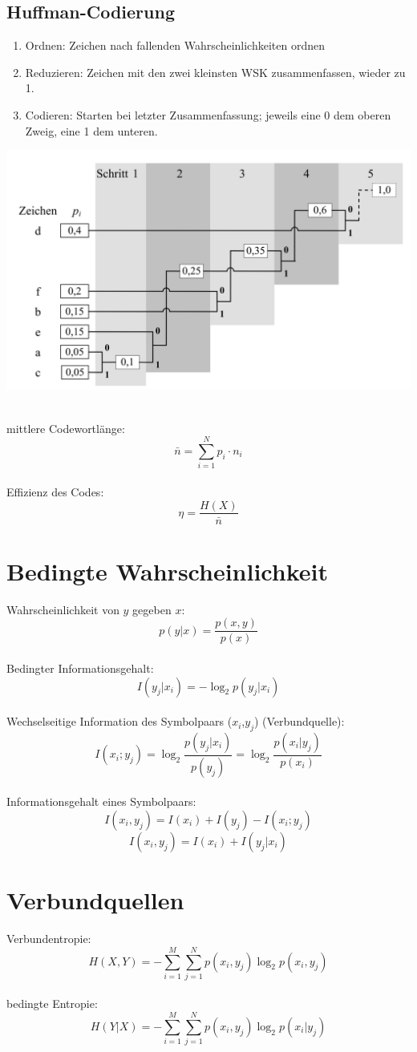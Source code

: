 \subsection{Huffman-Codierung}
\begin{enumerate}
	\item Ordnen: Zeichen nach fallenden Wahrscheinlichkeiten ordnen
	\item Reduzieren: Zeichen mit den zwei kleinsten WSK zusammenfassen,
		wieder zu 1.
	\item Codieren: Starten bei letzter Zusammenfassung; jeweils eine
		0 dem oberen Zweig, eine 1 dem unteren.
\end{enumerate}
\begin{center}
	\includegraphics[width=.9\textwidth]{../fig/huffman.png}
\end{center}
~\\
mittlere Codewortlänge:
\[ \bar{n} = \sum_{i=1}^{N}p_i \cdot n_i \]
~\\
Effizienz des Codes:
\[ \eta = \frac{H(X)}{\bar{n}} \]

\section{Bedingte Wahrscheinlichkeit}
Wahrscheinlichkeit von $y$ gegeben $x$:
\[ p(y|x) = \frac{p(x,y)}{p(x)} \]
~\\
Bedingter Informationsgehalt:
\[ I(y_j|x_i) = -\log_2p(y_j|x_i) \]
~\\
Wechselseitige Information des Symbolpaars ($x_i$,$y_j$) (Verbundquelle):
\[ I(x_i;y_j) = \log_2\frac{p(y_j|x_i)}{p(y_j)} = \log_2\frac{p(x_i|y_j)}{p(x_i)} \]
~\\
Informationsgehalt eines Symbolpaars:
\[ I(x_i,y_j) = I(x_i) + I(y_j) - I(x_i;y_j) \]
\[ I(x_i,y_j) = I(x_i) + I(y_j|x_i)  \]

\section{Verbundquellen}
Verbundentropie:
\[ H(X,Y) = - \sum_{i=1}^{M}\sum_{j=1}^{N} p(x_i,y_j)\log_2p(x_i,y_j) \]
~\\
bedingte Entropie:
\[ H(Y|X) = - \sum_{i=1}^{M}\sum_{j=1}^{N} p(x_i,y_j)\log_2p(x_i|y_j) \]

